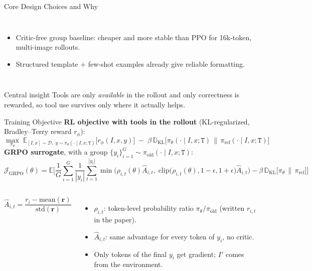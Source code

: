 \documentclass[aspectratio=169]{beamer}
\begin{document}
\begin{frame}{Core Design Choices and Why}
\begin{columns}[T]
    \begin{itemize}\small
      \item Critic-free group baseline: cheaper and more stable than PPO for 16k-token,
            multi-image rollouts.
      \item Structured template + few-shot examples already give reliable formatting.
    \end{itemize}
  \end{columns}
  \vspace{0.1cm}
  \begin{block}{Central insight}
    \small Tools are only \emph{available} in the rollout and only correctness is rewarded,
    so tool use survives only where it actually helps.
  \end{block}
\end{frame}

\begin{frame}{Training Objective}
  \small
  \setlength{\abovedisplayskip}{4pt}\setlength{\belowdisplayskip}{4pt}
  \textbf{RL objective with tools in the rollout} (KL-regularized, Bradley--Terry reward $r_\phi$):
  $$ \max_{\pi_\theta}\;
     \mathbb{E}_{[I,x]\sim\mathcal{D},\; y\sim\pi_\theta(\cdot\mid I,x;\texttt{T})}\big[r_\phi(I,x,y)\big]
     \;-\;\beta\,\mathbb{D}_{\mathrm{KL}}\big[\pi_\theta(\cdot\mid I,x;\texttt{T})\,\|\,\pi_{\mathrm{ref}}(\cdot\mid I,x;\texttt{T})\big] $$
  \textbf{GRPO surrogate}, with a group $\{y_i\}_{i=1}^{G}\sim\pi_{\text{old}}(\cdot\mid I,x;\texttt{T})$:
  $$ \mathcal{J}_{\text{GRPO}}(\theta) = \mathbb{E}\Bigg[\frac{1}{G}\sum_{i=1}^{G}\frac{1}{|y_i|}\sum_{t=1}^{|y_i|}
     \min\!\Big(\rho_{i,t}(\theta)\hat{A}_{i,t},\;
     \mathrm{clip}\big(\rho_{i,t}(\theta),1-\epsilon,1+\epsilon\big)\hat{A}_{i,t}\Big)
     - \beta\,\mathbb{D}_{\mathrm{KL}}\big[\pi_\theta\,\|\,\pi_{\mathrm{ref}}\big]\Bigg] $$
  \vspace{-0.2cm}
  \begin{columns}[T]
    $$ \hat{A}_{i,t} = \frac{r_i - \mathrm{mean}(\mathbf{r})}{\mathrm{std}(\mathbf{r})} $$
    \footnotesize
    \begin{itemize}
      \item $\rho_{i,t}$: token-level probability ratio $\pi_\theta/\pi_{\text{old}}$ (written $r_{i,t}$ in the paper).
      \item $\hat{A}_{i,t}$: same advantage for every token of $y_i$, no critic.
      \item Only tokens of the final $y_i$ get gradient; $I'$ comes from the environment.
    \end{itemize}
  \end{columns}
\end{frame}
\end{document}
